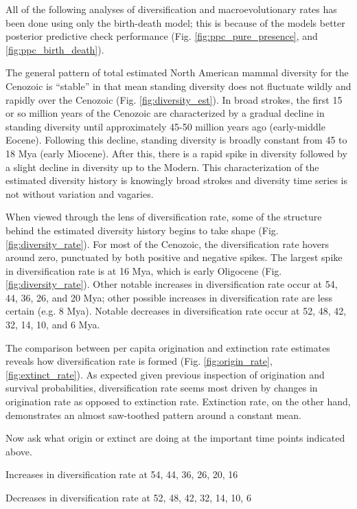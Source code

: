 \documentclass[12pt,letterpaper]{article}
\begin{document}
All of the following analyses of diversification and macroevolutionary rates has been done using only the birth-death model; this is because of the models better posterior predictive check performance (Fig. \ref{fig:ppc_pure_presence}, and \ref{fig:ppc_birth_death}). 


The general pattern of total estimated North American mammal diversity for the Cenozoic is ``stable'' in that mean standing diversity does not fluctuate wildly and rapidly over the Cenozoic (Fig. \ref{fig:diversity_est}). In broad strokes, the first 15 or so million years of the Cenozoic are characterized by a gradual decline in standing diversity until approximately 45-50 million years ago (early-middle Eocene). Following this decline, standing diversity is broadly constant from 45 to 18 Mya (early Miocene). After this, there is a rapid spike in diversity followed by a slight decline in diversity up to the Modern. This characterization of the estimated diversity history is knowingly broad strokes and diversity time series is not without variation and vagaries.

When viewed through the lens of diversification rate, some of the structure behind the estimated diversity history begins to take shape (Fig. \ref{fig:diversity_rate}). For most of the Cenozoic, the diversification rate hovers around zero, punctuated by both positive and negative spikes. The largest spike in diversification rate is at 16 Mya, which is early Oligocene (Fig. \ref{fig:diversity_rate}). Other notable increases in diversification rate occur at 54, 44, 36, 26, and 20 Mya; other possible increases in diversification rate are less certain (e.g. 8 Mya). Notable decreases in diversification rate occur at 52, 48, 42, 32, 14, 10, and 6 Mya. 

The comparison between per capita origination and extinction rate estimates reveals how diversification rate is formed (Fig. \ref{fig:origin_rate}, \ref{fig:extinct_rate}). As expected given previous inspection of origination and survival probabilities, diversification rate seems most driven by changes in origination rate as opposed to extinction rate. 
Extinction rate, on the other hand, demonstrates an almost saw-toothed pattern around a constant mean.

Now ask what origin or extinct are doing at the important time points indicated above.

Increases in diversification rate at 54, 44, 36, 26, 20, 16

Decreases in diversification rate at 52, 48, 42, 32, 14, 10, 6
\end{document}

